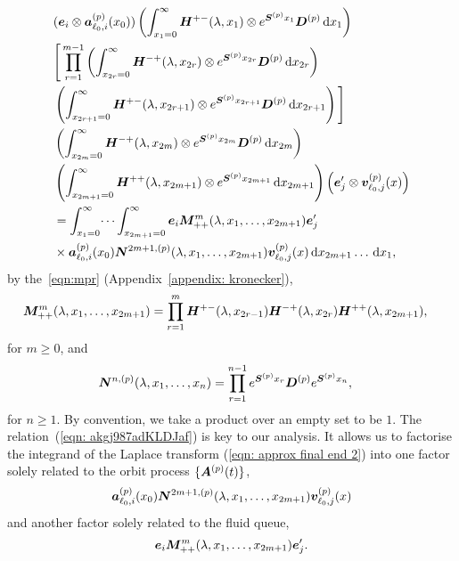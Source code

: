 \begin{align}
	&(\bs e_i \otimes \bs   a_{\ell_0,i}^{(p)}(x_0)) \left( \int_{x_1=0}^\infty \bs H^{+-}(\lambda,x_1)\otimes e^{\bs{S}^{(p)}x_1}\bs{D}^{(p)}\wrt x_1 \right)\nonumber%
	\\&\Bigg[\prod_{r=1}^{m-1} \left(\int_{x_{2r}=0}^\infty \bs H^{-+}(\lambda,x_{2r}) \otimes e^{\bs{S}^{(p)}x_{2r}}\bs{D}^{(p)}\wrt x_{2r}\right) \nonumber 
	\\&\nonumber \left(\int_{x_{2r+1}=0}^\infty \bs H^{+-}(\lambda,x_{2r+1})
	\otimes e^{\bs{S}^{(p)}x_{2r+1}}\bs{D}^{(p)} \wrt x_{2r+1} \right)\Bigg] 
	\\&\left(\int_{x_{2m}=0}^\infty \bs H^{-+}(\lambda,x_{2m})
	  \otimes e^{\bs{S}^{(p)}x_{2m}}\bs{D}^{(p)} \wrt x_{2m} \right) \nonumber 
	\\&\left(\int_{x_{2m+1}=0}^\infty \bs H^{++}(\lambda,x_{2m+1})\otimes 
	e^{\bs{S}^{(p)}x_{2m+1}} \wrt x_{2m+1}\right) \left(\bs e_j\tr{} \otimes {\bs v}_{\ell_0,j}^{(p)}(x)\right) \nonumber
	\\&=\int_{x_1=0}^\infty \dots \int_{x_{2m+1}=0}^\infty \bs e_i\bs M^{m}_{++}(\lambda,x_1,\dots,x_{2m+1})\bs e_j\tr{} \nonumber 
	\\&\times \bs a_{\ell_0,i}^{(p)}(x_0) \bs N^{2m+1,(p)}(\lambda,x_1,\dots,x_{2m+1}) {\bs v}_{\ell_0,j}^{(p)}( x)\wrt x_{2m+1}\dots\wrt x_1 ,
	 \label{eqn: approx final end 2}
\end{align}
by the~\ref{eqn:mpr} (Appendix~\ref{appendix: kronecker}), 
\begin{align}
	&\boldsymbol M^{m}_{++}(\lambda,x_1,\dots,x_{2m+1}) \nonumber 
	= \prod_{r=1}^{m}\boldsymbol H^{+-}(\lambda,x_{2r-1})\boldsymbol H^{-+}(\lambda,x_{2r})  
	\boldsymbol H^{++}(\lambda,x_{2m+1}),\nonumber 
\end{align}
for \(m\geq 0\), and
\begin{align}
	\boldsymbol N^{n,(p)}(\lambda,x_1,\dots,x_{n}) &= \prod_{r=1}^{n-1} e^{\boldsymbol{S}^{(p)}x_{r}}\boldsymbol{D}^{(p)} e^{\boldsymbol{S}^{(p)}x_{n}}, \nonumber 
\end{align}
for \(n\geq 1\). By convention, we take a product over an empty set to be \(1\). The relation~(\ref{eqn: akgj987adKLDJaf}) is key to our analysis. It allows us to factorise the integrand of the Laplace transform (\ref{eqn: approx final end 2}) into one factor solely related to the orbit process \(\{\boldsymbol A^{(p)}(t)\}\), 
\[\boldsymbol a_{\ell_0,i}^{(p)}(x_0) \boldsymbol N^{2m+1,(p)}(\lambda,x_1,\dots,x_{2m+1}) {\boldsymbol v}_{\ell_0,j}^{(p)}( x)\] 
and another factor solely related to the fluid queue,
\[\boldsymbol e_i\boldsymbol M^{m}_{++}(\lambda,x_1,\dots,x_{2m+1})\boldsymbol e_j'{}.\] 

